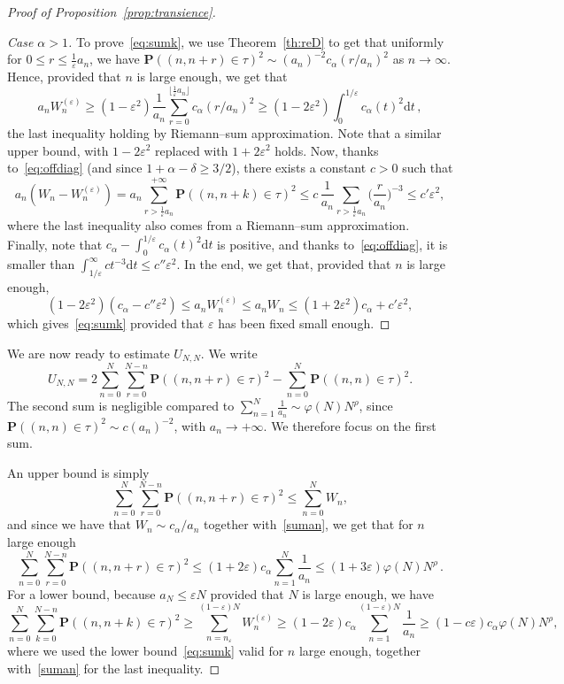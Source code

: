 \documentclass[11pt]{article}
\theoremstyle{definition}
\newenvironment{proofc}{\begin{proof}}{\end{proof}}
\numberwithin{equation}{section}
\numberwithin{figure}{section}
\numberwithin{table}{section}
\newenvironment{step}[1]{\begin{proof}[#1]}{\let\qed\relax\end{proof}}
\newcommand{\ga}{\alpha}
\newcommand{\gd}{\delta}
\newcommand{\gep}{\varepsilon}
\newcommand{\dd}{\mathrm{d}}
\newcommand{\bP}{\ensuremath{\mathbf{P}}}
\begin{document}
\begin{appendix}
\begin{proofc}[Proof of Proposition~\ref{prop:transience}]
\begin{step}{Case $\ga > 1$}
To prove~\eqref{eq:sumk}, we use Theorem~\ref{th:reD} to get that uniformly for $0\leq r\leq \tfrac 1\gep a_n$, we have $\bP((n,n+r) \in \tau)^2 \sim (a_n)^{-2} c_{\ga}(r/a_n)^2$ as $n\to\infty$. Hence, provided that $n$ is large enough, we get that
\[
a_n W_n^{(\gep)} \geq (1-\gep^2) \frac{1}{a_n} \sum_{r=0}^{\lfloor\frac1\gep a_n \rfloor} c_{\ga}(r/a_n)^2 \geq (1-2\gep^2) \int_{0}^{1/\gep} c_{\ga}(t)^2 \dd t\,,
\]
the last inequality holding by Riemann--sum approximation. Note that a similar upper bound, with $1-2\gep^2$ replaced with $1+2\gep^2$ holds. Now, thanks to~\eqref{eq:offdiag} (and since $1+\ga-\gd \geq 3/2$), there exists a constant $c>0$ such that
\[
a_n(W_n-W_n^{(\gep)}) = a_n \sum_{r > \frac1\gep a_n}^{+\infty} \bP((n,n+k) \in \tau)^2 \leq c\,\frac{1}{a_n} \sum_{r>\frac1\gep a_n} \Big(\frac{r}{a_n} \Big)^{-3} \leq c' \gep^2,
\]
where the last inequality also comes from a Riemann--sum approximation. Finally, note that $c_\ga -\int_{0}^{1/\gep} c_{\ga}(t)^2 \dd t $ is positive, and thanks to~\eqref{eq:offdiag}, it is smaller than $\int_{1/\gep}^{\infty} c t^{-3} \dd t \leq c'' \gep^2$. In the end, we get that, provided that $n$ is large enough,
\begin{equation}
(1-2\gep^2) (c_{\ga} - c'' \gep^2) \leq a_n W_n^{(\gep)} \leq a_n W_n \leq (1+2\gep^2) c_{\ga} + c' \gep^2,
\end{equation}
which gives~\eqref{eq:sumk} provided that $\gep$ has been fixed small enough.
\end{step}

We are now ready to estimate $U_{N,N}$. We write
\[
U_{N,N} = 2\sum_{n=0}^{N} \sum_{r=0}^{N-n} \bP((n,n+r) \in\tau)^2 - \sum_{n=0}^N \bP((n,n)\in\tau)^2.
\]
The second sum is negligible compared to $\sum_{n=1}^N \tfrac{1}{a_n}\sim \varphi(N) N^{\rho}$, since $\bP({(n,n)\in\tau})^2 \sim c (a_n)^{-2}$, with $a_n \to +\infty$. We therefore focus on the first sum.

An upper bound is simply
\[
\sum_{n=0}^N \sum_{r=0}^{N-n} \bP((n,n+r) \in\tau)^2 \leq \sum_{n=0}^N W_n,
\]
and since we have that $W_n \sim c_{\ga}/a_n$ together with~\eqref{suman}, we get that for $n$ large enough
\[
\sum_{n=0}^N \sum_{r=0}^{N-n} \bP((n,n+r) \in\tau)^2 \leq (1+2\gep) c_{\ga} \sum_{n=1}^N \frac{1}{a_n} \leq (1+3\gep) \varphi(N) N^{\rho}\,.
\]
For a lower bound, because $a_N\leq \gep N$ provided that $N$ is large enough, we have
\[
\sum_{n=0}^{N} \sum_{k=0}^{N-n} \bP((n,n+k) \in\tau)^2 \geq \sum_{n=n_{\gep}}^{(1-\gep) N} W_n^{(\gep)} \geq (1-2\gep) c_{\ga} \sum_{n=1}^{(1-\gep)N} \frac{1}{a_n} \geq (1- c\gep)c_{\ga} \varphi(N) N^{\rho},
\]
where we used the lower bound~\eqref{eq:sumk} valid for $n$ large enough, together with~\eqref{suman} for the last inequality.


\end{proofc}
\end{appendix}
\end{document}
